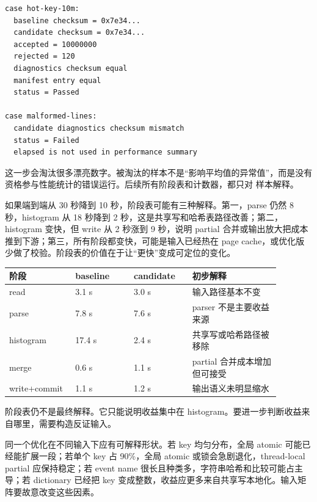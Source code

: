 \begin{lstlisting}[numbers=none,caption={性能样本先过语义闸门}]
case hot-key-10m:
  baseline checksum = 0x7e34...
  candidate checksum = 0x7e34...
  accepted = 10000000
  rejected = 120
  diagnostics checksum equal
  manifest entry equal
  status = Passed

case malformed-lines:
  candidate diagnostics checksum mismatch
  status = Failed
  elapsed is not used in performance summary
\end{lstlisting}

这一步会淘汰很多漂亮数字。被淘汰的样本不是“影响平均值的异常值”，而是没有资格参与性能统计的错误运行。后续所有阶段表和计数器，都只对  样本解释。

如果端到端从 30 秒降到 10 秒，阶段表可能有三种解释。第一，parse 仍然 8 秒，histogram 从 18 秒降到 2 秒，这是共享写和哈希表路径改善；第二，histogram 变快，但 write 从 2 秒涨到 9 秒，说明 partial 合并或输出放大把成本推到下游；第三，所有阶段都变快，可能是输入已经热在 page cache，或优化版少做了校验。阶段表的价值在于让“更快”变成可定位的变化。

\begin{center}
\begin{tabular}{p{0.18\linewidth}p{0.20\linewidth}p{0.20\linewidth}p{0.30\linewidth}}
\toprule
阶段 & baseline & candidate & 初步解释 \\
\midrule
read & 3.1 s & 3.0 s & 输入路径基本不变 \\
parse & 7.8 s & 7.6 s & parser 不是主要收益来源 \\
histogram & 17.4 s & 2.4 s & 共享写或哈希路径被移除 \\
merge & 0.6 s & 1.1 s & partial 合并成本增加但可接受 \\
write+commit & 1.1 s & 1.2 s & 输出语义未明显缩水 \\
\bottomrule
\end{tabular}
\end{center}

阶段表仍不是最终解释。它只能说明收益集中在 histogram。要进一步判断收益来自哪里，需要构造反证输入。

同一个优化在不同输入下应有可解释形状。若 key 均匀分布，全局 atomic 可能已经能扩展一段；若单个 key 占 90\%，全局 atomic 或锁会急剧退化，thread-local partial 应保持稳定；若 event name 很长且种类多，字符串哈希和比较可能占主导；若 dictionary 已经把 key 变成整数，收益应更多来自共享写本地化。输入矩阵要故意改变这些因素。

